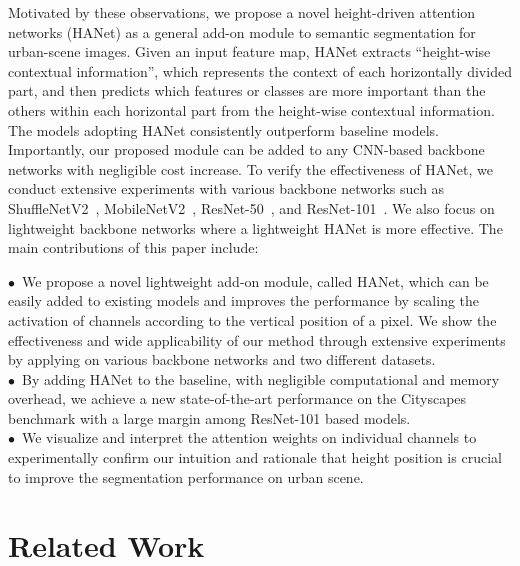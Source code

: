 \documentclass[10pt,twocolumn,letterpaper]{article}
\newenvironment{myindentpar}[1]{\begin{list}{}{\setlength{\leftmargin}{#1}}\item[]}
  {\end{list}}
\begin{document}
Motivated by these observations, we propose a novel height-driven attention networks
(HANet) as a general add-on module to semantic segmentation for urban-scene images. Given an input feature map, HANet extracts ``height-wise contextual information'', which represents the context of each horizontally divided part, and then predicts which features or classes are more important than the others within each horizontal part from the height-wise contextual information. 
The models adopting HANet consistently outperform baseline models. Importantly, our proposed module can be added to any CNN-based backbone networks with negligible cost increase. To verify the effectiveness of HANet, we conduct extensive experiments with various backbone networks such as ShuffleNetV2~\cite{ma2018shufflenet}, MobileNetV2~\cite{Sandler_2018}, ResNet-50~\cite{he2016deep}, and ResNet-101~\cite{he2016deep}. We also focus on lightweight backbone networks where a lightweight HANet is more effective.
The main contributions of this paper include:

\begin{myindentpar}{0.2cm}
\vspace*{-0.3cm}
\noindent$\bullet$ \,We propose a novel lightweight add-on module, called HANet,
which can be easily added to existing models and improves the performance by scaling the activation of channels according to the vertical position of a pixel. We show the effectiveness and wide applicability of our method through extensive experiments by applying on various backbone networks and two different datasets.
\vspace*{-0.1cm}
\\[0.3em]
$\bullet$ \,By adding HANet to the baseline, with negligible computational and memory overhead, we achieve a new state-of-the-art performance on the Cityscapes benchmark with a large margin among ResNet-101 based models.
\\[0.3em]
$\bullet$ \,We visualize and interpret the attention weights on individual channels
to experimentally confirm our intuition and rationale that height position is crucial to improve the segmentation performance on urban scene.
\end{myindentpar}

\vspace*{-0.4cm}
\section{Related Work}
\vspace*{-0.1cm}
\end{document}
